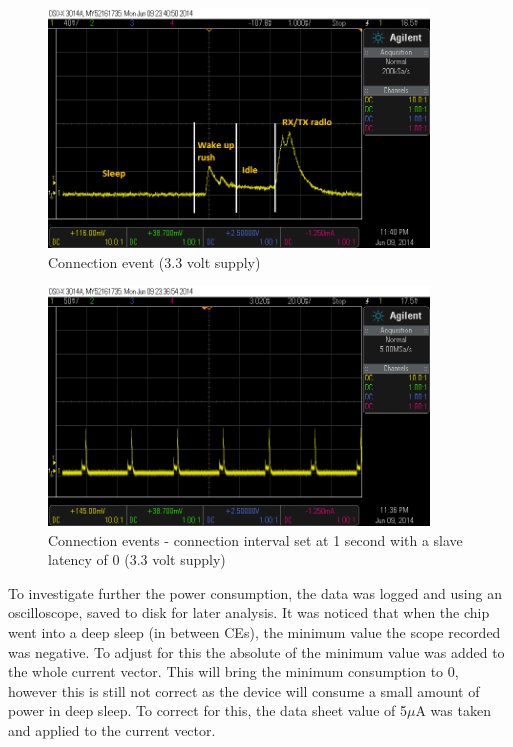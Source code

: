 \documentclass[]{article}
\begin{document}
\begin{figure}[H]
	\begin{center}
		\includegraphics[width = 0.9\textwidth]{ceclose}
	\end{center}
	\caption{Connection event (3.3 volt supply)}
	\label{fig:ceclose}
\end{figure}


\begin{figure}[H]
	\begin{center}
		\includegraphics[width = 0.9\textwidth]{ce}
	\end{center}
	\caption{Connection events - connection interval set at 1 second with a slave latency of 0 (3.3 volt supply)}
	\label{fig:ce}
\end{figure}

To investigate further the power consumption, the data was logged and using an oscilloscope, saved to disk for later analysis. It was noticed that when the chip went into a deep sleep (in between \ac{CE}s), the minimum value the scope recorded was negative. To adjust for this the absolute of the minimum value was added to the whole current vector. This will bring the minimum consumption to 0, however this is still not correct as the device will consume a small amount of power in deep sleep. To correct for this, the data sheet value of 5$\mu$A was taken and applied to the current vector. 
\end{document}
